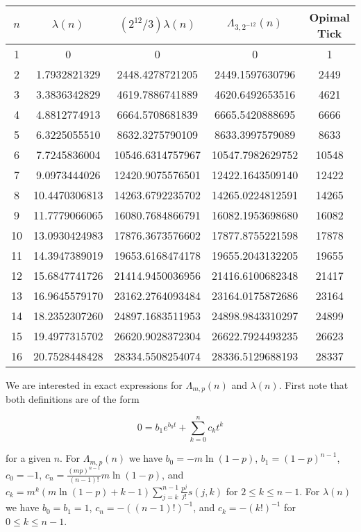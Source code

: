 \documentclass[12pt]{article}
\theoremstyle{plain}
\theoremstyle{definition}
\theoremstyle{remark}
\theoremstyle{definition}
\begin{document}
\begin{center}
\begin{tabular}{| c | c | c | c | c |}
\hline
 $n$ & $\lambda(n)$ & $(2^{12}/3)\lambda(n)$ & $\Lambda_{3,2^{-12}}(n)$ & Opimal Tick\\ 
 \hline
1 & 0 & 0 & 0 & 1\\ 
2 & 1.7932821329 & 2448.4278721205 & 2449.1597630796 & 2449\\
3 & 3.3836342829 & 4619.7886741889 & 4620.6492653516 & 4621\\
4 & 4.8812774913 & 6664.5708681839 & 6665.5420888695 & 6666\\
5 & 6.3225055510 & 8632.3275790109 & 8633.3997579089 & 8633\\
6 & 7.7245836004 & 10546.6314757967 & 10547.7982629752 & 10548\\
7 & 9.0973444026 & 12420.9075576501 & 12422.1643509140 & 12422\\
8 & 10.4470306813 & 14263.6792235702 & 14265.0224812591 & 14265\\
9 & 11.7779066065 & 16080.7684866791 & 16082.1953698680 & 16082\\
10 & 13.0930424983 & 17876.3673576602 & 17877.8755221598 & 17878\\
11 & 14.3947389019 & 19653.6168474178 & 19655.2043132205 & 19655\\
12 & 15.6847741726 & 21414.9450036956 & 21416.6100682348 & 21417\\
13 & 16.9645579170 & 23162.2764093484 & 23164.0175872686 & 23164\\
14 & 18.2352307260 & 24897.1683511953 & 24898.9843310297 & 24899\\
15 & 19.4977315702 & 26620.9028372304 & 26622.7924493235 & 26623\\
16 & 20.7528448428 & 28334.5508254074 & 28336.5129688193 & 28337\\
 \hline
\end{tabular}
\end{center}

We are interested in exact expressions for $\Lambda_{m,p}(n)$ and $\lambda(n)$. First note that both definitions are of the form 

\begin{equation*}\label{eq: base eq}
    0 = b_1 e^{b_0 t} + \sum_{k=0}^n c_k t^k
\end{equation*}

for a given $n$. For $\Lambda_{m,p}(n)$ we have $b_0=-m\ln(1-p)$, $b_1=(1-p)^{n-1}$, $c_0=-1$, $c_n=\frac{(mp)^{n-1}}{(n-1)!}m\ln(1-p)$, and $c_k = m^k (m\ln(1-p)+k-1) \sum_{j=k}^{n-1}\frac{p^j}{j!}s(j,k)$ for $2 \leq k\leq n-1$. For $\lambda(n)$ we have $b_0 = b_1 = 1$, $c_n = -((n-1)!)^{-1}$, and $c_k = -(k!)^{-1}$ for $0\leq k \leq n-1$.
\end{document}
